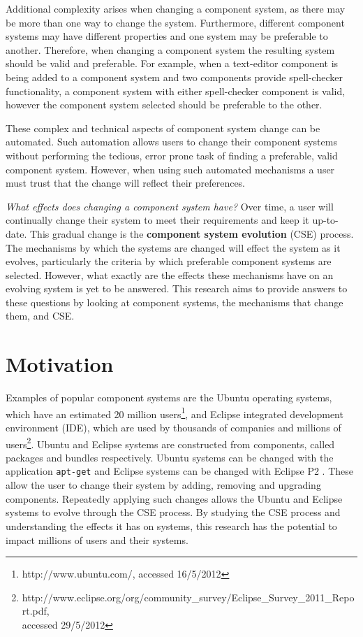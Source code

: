 Additional complexity arises when changing a component system,
as there may be more than one way to change the system.
Furthermore, different component systems may have different properties and one system may be preferable to another.
Therefore, when changing a component system the resulting system should be valid and preferable.  
For example, when a text-editor component is being added to a component system and two components provide spell-checker functionality, 
a component system with either spell-checker component is valid, however the component system selected should be preferable to the other.

These complex and technical aspects of component system change can be automated. 
Such automation allows users to change their component systems without performing the tedious, error prone task of finding a preferable, valid component system.
However, when using such automated mechanisms a user must trust that the change will reflect their preferences.


\textit{What effects does changing a component system have?}
Over time, a user will continually change their system to meet their requirements and keep it up-to-date.
This gradual change is the \textbf{component system evolution} (CSE) process.
The mechanisms by which the systems are changed will effect the system as it evolves,
particularly the criteria by which preferable component systems are selected.
However, what exactly are the effects these mechanisms have on an evolving system is yet to be answered. 
This research aims to provide answers to these questions by looking at component systems, the mechanisms that change them, and CSE.

\section{Motivation}
Examples of popular component systems are the Ubuntu operating systems, which have an estimated 20 million users\footnote{http://www.ubuntu.com/, accessed 16/5/2012},
and Eclipse integrated development environment (IDE), which are used by thousands of companies and millions of users\footnote{http://www.eclipse.org/org/community\_survey/Eclipse\_Survey\_2011\_Report.pdf, \\accessed 29/5/2012}.
Ubuntu and Eclipse systems are constructed from components, called packages and bundles respectively. 
Ubuntu systems can be changed with the application \texttt{apt-get} \citep{Barth2005} and Eclipse systems can be changed with Eclipse P2 \citep{leBerre2010}.
These allow the user to change their system by adding, removing and upgrading components.
Repeatedly applying such changes allows the Ubuntu and Eclipse systems to evolve through the CSE process.
By studying the CSE process and understanding the effects it has on systems, this research has the potential to impact millions of users and their systems.


